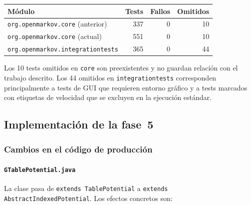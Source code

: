\documentclass[11pt,a4paper]{article}
\newcommand{\code}[1]{\texttt{#1}}
\begin{document}
\begin{center}
\begin{tabular}{lrrr}
\toprule
\textbf{Módulo} & \textbf{Tests} & \textbf{Fallos} & \textbf{Omitidos} \\
\midrule
\code{org.openmarkov.core} (anterior) & 337 & 0 & 10 \\
\code{org.openmarkov.core} (actual)   & 551 & 0 & 10 \\
\midrule
\code{org.openmarkov.integrationtests} & 365 & 0 & 44 \\
\bottomrule
\end{tabular}
\end{center}

Los 10 tests omitidos en \code{core} son preexistentes y no guardan relación
con el trabajo descrito.  Los 44 omitidos en \code{integrationtests} corresponden
principalmente a tests de GUI que requieren entorno gráfico y a tests marcados
con etiquetas de velocidad que se excluyen en la ejecución estándar.

\subsection{Implementación de la fase~5}
\label{sec:fase5-impl}

\subsubsection*{Cambios en el código de producción}

\paragraph{\code{GTablePotential.java}}

La clase pasa de \code{extends TablePotential} a
\code{extends Abstract\-Indexed\-Potential}.
Los efectos concretos son:
\end{document}
